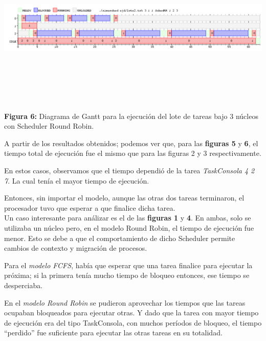 \documentclass[a4paper]{article}
\begin{document}
  \includegraphics[width=\textwidth,height=3.0in,keepaspectratio]{imagenes/ej4/3core.png} \newline
\begin {flushleft}
\textbf{Figura 6:} Diagrama de Gantt para la ejecuci\'on del lote de tareas bajo 3 n\'ucleos con Scheduler Round Robin.
\end{flushleft}
 
\bigskip 
 
A partir de los resultados obtenidos; podemos ver que, para las \textbf{figuras 5} y \textbf{6}, el tiempo total de ejecución fue el mismo que para las figuras 2 y 3 respectivamente. 

En estos casos, observamos que el tiempo dependió de la tarea \emph{TaskConsola 4 2 7}. La cual ten\'ia el mayor tiempo de ejecución. 

Entonces, sin importar el modelo, aunque las otras dos tareas terminaron, el procesador tuvo que esperar a que finalice dicha tarea.\\

Un caso interesante para análizar es el de las \textbf{figuras 1} y \textbf{4}. En ambas, solo se utilizaba un núcleo pero, en el modelo Round Robin, el tiempo de ejecución fue menor. Esto se debe a que el comportamiento de dicho Scheduler permite cambios de contexto y migración de procesos.

 Para el \emph{modelo FCFS}, había que esperar que una tarea finalice para ejecutar la próxima; si la primera tenía mucho tiempo de bloqueo entonces, ese tiempo se desperciaba. 
 
 En el \emph{modelo Round Robin} se pudieron aprovechar los tiempos que las tareas ocupaban bloqueados para ejecutar otras. Y dado que la tarea con mayor tiempo de ejecución era del tipo TaskConsola, con muchos períodos de bloqueo, el tiempo ``perdido'' fue suficiente para ejecutar las otras tareas en su totalidad.  
 \bigskip
 
\end{document}
